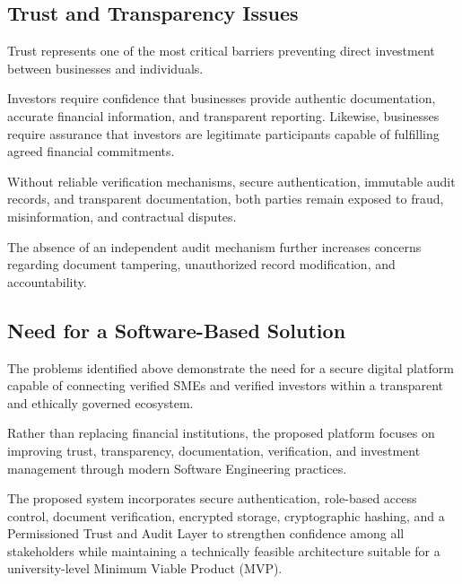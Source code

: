 
\subsection{Trust and Transparency Issues}

Trust represents one of the most critical barriers preventing direct investment between businesses and individuals.

Investors require confidence that businesses provide authentic documentation, accurate financial information, and transparent reporting. Likewise, businesses require assurance that investors are legitimate participants capable of fulfilling agreed financial commitments.

Without reliable verification mechanisms, secure authentication, immutable audit records, and transparent documentation, both parties remain exposed to fraud, misinformation, and contractual disputes.

The absence of an independent audit mechanism further increases concerns regarding document tampering, unauthorized record modification, and accountability.


\subsection{Need for a Software-Based Solution}

The problems identified above demonstrate the need for a secure digital platform capable of connecting verified SMEs and verified investors within a transparent and ethically governed ecosystem.

Rather than replacing financial institutions, the proposed platform focuses on improving trust, transparency, documentation, verification, and investment management through modern Software Engineering practices.

The proposed system incorporates secure authentication, role-based access control, document verification, encrypted storage, cryptographic hashing, and a Permissioned Trust and Audit Layer to strengthen confidence among all stakeholders while maintaining a technically feasible architecture suitable for a university-level Minimum Viable Product (MVP).